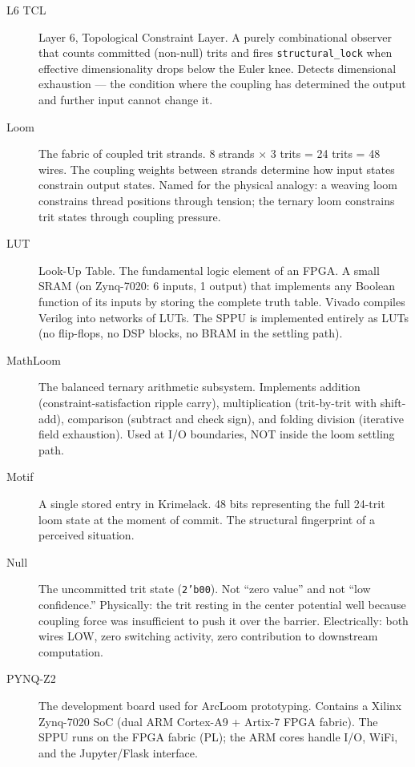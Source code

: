 \documentclass[11pt,a4paper]{article}
\begin{document}
\begin{description}
\item[L6 TCL] Layer 6, Topological Constraint Layer. A purely combinational observer that counts committed (non-null) trits and fires \texttt{structural\_lock} when effective dimensionality drops below the Euler knee. Detects dimensional exhaustion --- the condition where the coupling has determined the output and further input cannot change it.

\item[Loom] The fabric of coupled trit strands. 8 strands $\times$ 3 trits = 24 trits = 48 wires. The coupling weights between strands determine how input states constrain output states. Named for the physical analogy: a weaving loom constrains thread positions through tension; the ternary loom constrains trit states through coupling pressure.

\item[LUT] Look-Up Table. The fundamental logic element of an FPGA. A small SRAM (on Zynq-7020: 6 inputs, 1 output) that implements any Boolean function of its inputs by storing the complete truth table. Vivado compiles Verilog into networks of LUTs. The SPPU is implemented entirely as LUTs (no flip-flops, no DSP blocks, no BRAM in the settling path).

\item[MathLoom] The balanced ternary arithmetic subsystem. Implements addition (constraint-satisfaction ripple carry), multiplication (trit-by-trit with shift-add), comparison (subtract and check sign), and folding division (iterative field exhaustion). Used at I/O boundaries, NOT inside the loom settling path.

\item[Motif] A single stored entry in Krimelack. 48 bits representing the full 24-trit loom state at the moment of commit. The structural fingerprint of a perceived situation.

\item[Null] The uncommitted trit state (\texttt{2'b00}). Not ``zero value'' and not ``low confidence.'' Physically: the trit resting in the center potential well because coupling force was insufficient to push it over the barrier. Electrically: both wires LOW, zero switching activity, zero contribution to downstream computation.

\item[PYNQ-Z2] The development board used for ArcLoom prototyping. Contains a Xilinx Zynq-7020 SoC (dual ARM Cortex-A9 + Artix-7 FPGA fabric). The SPPU runs on the FPGA fabric (PL); the ARM cores handle I/O, WiFi, and the Jupyter/Flask interface.


\end{description}
\end{document}
